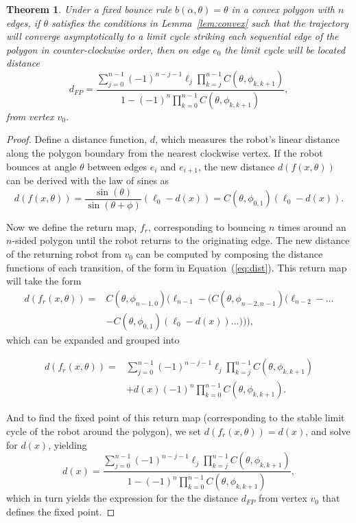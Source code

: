 \documentclass[sageh,times,Review]{sagej}
\newtheorem{theorem}{Theorem}
\begin{document}
\begin{theorem}
\label{theo:fixedPoint}
Under a fixed bounce rule $b(\alpha, \theta) = \theta$ in a convex polygon with $n$ edges, 
if $\theta$ satisfies the conditions in Lemma~\ref{lem:convex} such that the trajectory will converge asymptotically to a limit cycle striking each sequential edge of the polygon in counter-clockwise order, then on edge $e_0$ the limit cycle will be located distance
\begin{equation}
\label{eq:fixedPoint}
d_{FP} =\frac{\sum_{j=0}^{n-1} (-1)^{n-j-1} \ell_j \prod_{k=j}^{n-1} C(\theta, \phi_{k, k+1})}
{1 - (-1)^n \prod_{k=0}^{n-1} C(\theta, \phi_{k, k+1})},
\end{equation}
from vertex $v_0$. 
\end{theorem}
\begin{proof}
Define a distance function, $d$, which measures the robot's linear distance
along the polygon boundary from the nearest clockwise vertex. If the robot bounces 
at angle $\theta$ between edges $e_i$ and $e_{i+1}$, the new distance $d(f(x, \theta))$ can be derived with the law of sines as
\begin{equation} \label{eq:dist}
d(f(x, \theta)) = \frac{\sin(\theta)}{\sin(\theta + \phi)} (\ell_0 - d(x)) =
C(\theta, \phi_{0,1}) (\ell_0 - d(x)).
\end{equation}

Now we define the return map, $f_{r}$, corresponding to bouncing $n$
times around an $n$-sided polygon until the robot returns to the originating
edge. The new distance of the returning robot from $v_0$ can be computed by
composing the distance functions of each transition, of the form in Equation~(\ref{eq:dist}). This return map will take the form
\begin{equation*}
\begin{aligned}
d(f_{r}(x, \theta)) ={} & C(\theta, \phi_{n-1, 0}) (\ell_{n-1}  - (C(\theta, \phi_{n-2, n-1})(\ell_{n-2} - \ldots \\
& - C(\theta, \phi_{0,1})(\ell_0 - d(x)) \ldots ))),
\end{aligned}
\end{equation*}
which can be expanded and grouped into

\begin{equation*}
\begin{aligned}
d(f_{r}(x, \theta)) ={} & 
\sum_{j=0}^{n-1} (-1)^{n-j-1} \ell_j \prod_{k=j}^{n-1} C(\theta, \phi_{k, k+1}) \\
& + d(x) (-1)^n \prod_{k=0}^{n-1} C(\theta, \phi_{k, k+1}).
\end{aligned}
\end{equation*}

And to find the fixed point of this return map (corresponding to the stable
limit cycle of the robot around the polygon), we set $d(f_{r}(x, \theta)) =
d(x)$, and solve for $d(x)$, yielding
$$
d(x) =\frac{\sum_{j=0}^{n-1} (-1)^{n-j-1} \ell_j \prod_{k=j}^{n-1} C(\theta, \phi_{k, k+1})}
{1 - (-1)^n \prod_{k=0}^{n-1} C(\theta, \phi_{k, k+1})},
$$
which in turn yields the expression for the the distance $d_{FP}$ from vertex $v_0$ that defines the fixed point. 
\end{proof}
\end{document}

